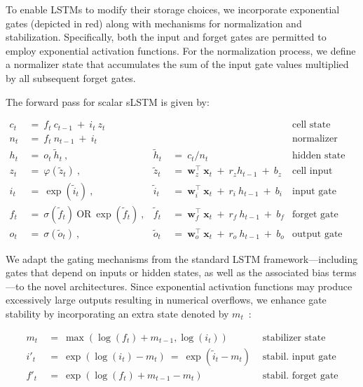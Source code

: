 To enable LSTMs to modify their storage choices, we incorporate exponential gates (depicted in red) along with mechanisms for normalization and stabilization. Specifically, both the input and forget gates are permitted to employ exponential activation functions. For the normalization process, we define a normalizer state that accumulates the sum of the input gate values multiplied by all subsequent forget gates.

The forward pass for scalar sLSTM is given by:

\begin{align}
\label{eq:slstmforward}
c_t \ &= \  f_t \ c_{t-1} \ + \ i_t \ z_t & & 
 &\text{cell state} \\
n_t \ &= \  f_t \ n_{t-1} \ + \ i_t  & & 
 &\text{normalizer state} \\
h_t \ &= \ o_t \ \tilde{h}_t \ ,
  &\tilde{h}_t \ &= \ c_t / n_t
&\text{hidden state} \\
z_t \ &= \ \varphi \left( \tilde{z}_t \right) \ , 
  &\tilde{z}_t \ &=  \ \mathbf{w}^\top_{z} \ \mathbf{x}_t \ + \
  r_{z}  h_{t-1} \ + \  b_{z}
  &\text{cell input} \\
i_t \ &= \ \!\exp \left( \tilde{i}_t  \right) \ , 
  &\tilde{i}_t \ &= \ \mathbf{w}^\top_{i} \ \mathbf{x}_t \ + \
  r_{i}  \ h_{t-1} \ + \  b_{i}
  &\text{input gate} \\
f_t \ &= \ \sigma \left(  \tilde{f}_t \right) \ \text{OR} \
\!\exp \left(  \tilde{f}_t \right) \ ,
  &\tilde{f}_t \ &= \ \mathbf{w}^\top_{f} \ \mathbf{x}_t  \ + \
  r_{f}  \ h_{t-1} \ + \  b_{f}
  &\text{forget gate} \\
o_t \ &= \ \sigma \left( \tilde{o}_t \right) \ , 
  &\tilde{o}_t  \ &= \ \mathbf{w}^\top_{o} \ \mathbf{x}_t \ + \
  r_{o}  \ h_{t-1} \ + \  b_{o}
  &\text{output gate} 
\end{align}

We adapt the gating mechanisms from the standard LSTM framework—including gates that depend on inputs or hidden states, as well as the associated bias terms—to the novel architectures. Since exponential activation functions may produce excessively large outputs resulting in numerical overflows, we enhance gate stability by incorporating an extra state denoted by \mbox{$m_t$~\citep{Milakov:18arxiv}}:

\begin{align}
\label{eq:slstmstabil}
m_t \ &= \ \max \left( \log ( f_t ) + m_{t-1} , \log ( i_t ) \right) &\text{stabilizer state} \\
i'_t \ &= \ \!\exp \left( \log \left ( i_t \right) - m_t \right) \ = \ \!\exp \left( \tilde{i}_t - m_t \right) \ \, 
  &\text{stabil. input gate} \\
f'_t \ &= \ \!\exp \left( \log \left( f_t \right) + m_{t-1} - m_t \right) \ \, 
  &\text{stabil. forget gate}
\end{align}

